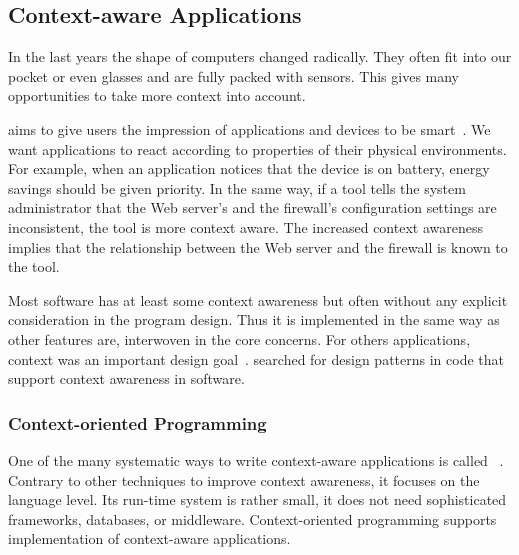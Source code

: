 \subsection{Context-aware Applications}

In the last years the shape of computers changed radically.
They often fit into our pocket or even glasses and are fully packed with sensors.
This gives many opportunities to take more context into account.

aims to give users the impression of applications and devices to be smart~\cite{raab2015global}.
We want applications to react according to properties of their physical environments.
For example, when an application notices that the device is on battery, energy savings should be given priority.
In the same way, if a tool tells the system administrator that the Web server's and the firewall's configuration settings are inconsistent, the tool is more context aware.
The increased context awareness implies that the relationship between the Web server and the firewall is known to the tool.

Most software has at least some context awareness but often without any explicit consideration in the program design.
Thus it is implemented in the same way as other features are, interwoven in the core concerns.
For others applications, context was an important design goal~\cite{baldauf2007survey}.
\citet{riva2006unearthing} searched for design patterns in code that support context awareness in software.


\subsubsection{Context-oriented Programming}

One of the many systematic ways to write context-aware applications is called ~\cite{baldauf2007survey,hong2009context,alegre2016engineering,kamina2014context,dey2000towards,keays2003context,tanter2008contextvalues,schippers2010contextoperational,wasty2010contextlua,appeltauer2009contextcomparision,plaice2010contextcartesian,costanza2006efficientlayeractivation,lowis2007contextbeyond,appeltauer2008dedicated,salvaneschi2012context,hirschfeld2014visibility,springer2016cop,gonzalez2011subjective,aotani2014unifying}.
Contrary to other techniques to improve context awareness, it focuses on the language level.
Its run-time system is rather small, it does not need sophisticated frameworks, databases, or middleware.
Context-oriented programming supports implementation of context-aware applications.

